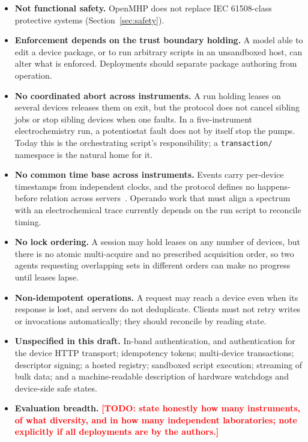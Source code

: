 \documentclass[11pt]{article}
\newcommand{\TODO}[1]{\textcolor{red}{\textbf{[TODO: #1]}}}
\begin{document}
\begin{itemize}
  \item \textbf{Not functional safety.} OpenMHP does not replace IEC 61508-class protective
    systems (Section~\ref{sec:safety}).
  \item \textbf{Enforcement depends on the trust boundary holding.} A model able to edit a
    device package, or to run arbitrary scripts in an unsandboxed host, can alter what is
    enforced. Deployments should separate package authoring from operation.
  \item \textbf{No coordinated abort across instruments.} A run holding leases on several
    devices releases them on exit, but the protocol does not cancel sibling jobs or stop
    sibling devices when one faults. In a five-instrument electrochemistry run, a
    potentiostat fault does not by itself stop the pumps. Today this is the orchestrating
    script's responsibility; a \texttt{transaction/} namespace is the natural home for it.
  \item \textbf{No common time base across instruments.} Events carry per-device
    timestamps from independent clocks, and the protocol defines no happens-before relation
    across servers~\cite{lamport1978}. Operando work that must align a spectrum with an
    electrochemical trace currently depends on the run script to reconcile timing.
  \item \textbf{No lock ordering.} A session may hold leases on any number of devices, but
    there is no atomic multi-acquire and no prescribed acquisition order, so two agents
    requesting overlapping sets in different orders can make no progress until leases lapse.
  \item \textbf{Non-idempotent operations.} A request may reach a device even when its
    response is lost, and servers do not deduplicate. Clients must not retry writes or
    invocations automatically; they should reconcile by reading state.
  \item \textbf{Unspecified in this draft.} In-band authentication, and authentication for the
    device HTTP transport; idempotency tokens; multi-device transactions; descriptor signing;
    a hosted registry; sandboxed script execution; streaming of bulk data; and a
    machine-readable description of hardware watchdogs and device-side safe states.
  \item \textbf{Evaluation breadth.} \TODO{state honestly how many instruments, of what
    diversity, and in how many independent laboratories; note explicitly if all deployments
    are by the authors.}
\end{itemize}
\end{document}
